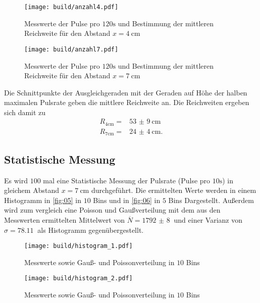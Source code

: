 \begin{figure}[H]
  \centering
  \caption{Messwerte der Pulse pro $120\unit{\second}$ und Bestimmung der mittleren Reichweite für den Abstand $x = \qty{4}{\centi\meter}$}
  \label{fig:13}
  \texttt{[image: build/anzahl4.pdf]}
\end{figure}

\begin{figure}[H]
  \centering
  \caption{Messwerte der Pulse pro $120\unit{\second}$ und Bestimmung der mittleren Reichweite für den Abstand $x = \qty{7}{\centi\meter}$}
  \label{fig:14}
  \texttt{[image: build/anzahl7.pdf]}
\end{figure}
\noindent Die Schnittpunkte der Ausgleichgeraden mit der Geraden auf Höhe der
halben maximalen Pulsrate geben die mittlere Reichweite an. Die Reichweiten
ergeben sich damit zu 
\begin{align}
  R_\text{4cm} = &\qty{53(9)}{\centi\meter} \\
  R_\text{7cm} = &\qty{24(4)}{\centi\meter}.
\end{align}

\subsection{Statistische Messung}
Es wird $100$ mal eine Statistische Messung der Pulsrate (Pulse pro $10\unit{\second}$) in gleichem Abstand $x=\qty{7}{\centi\meter}$ 
durchgeführt. Die ermittelten Werte werden in einem Histogramm in \autoref{fig:05} in $10$ Bins und in \autoref{fig:06} in $5$ Bins Dargestellt. 
Außerdem wird zum vergleich eine Poisson und Gaußverteilung mit dem aus den Messwerten ermittelten Mittelwert von $\overline{N} = \qty{1792(8)}{}$ und einer Varianz von 
$\sigma = \qty{78.11}{}$ als Histogramm gegenübergestellt.
\begin{figure}[H]
  \centering
  \caption{Messwerte sowie Gauß- und Poissonverteilung in $10$ Bins}
  \label{fig:05}
  \texttt{[image: build/histogram\_1.pdf]}
\end{figure}
\begin{figure}[H]
  \centering
  \caption{Messwerte sowie Gauß- und Poissonverteilung in $10$ Bins}
  \label{fig:06}
  \texttt{[image: build/histogram\_2.pdf]}
\end{figure}